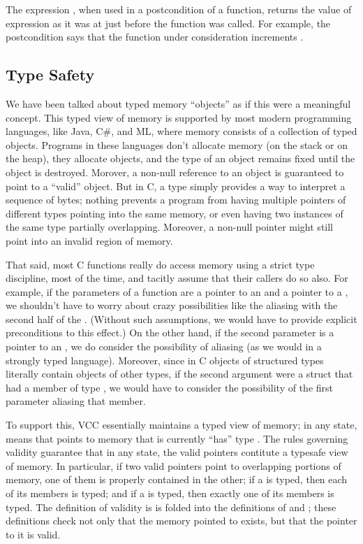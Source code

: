The expression , when used in a postcondition of a
function, returns the value of expression  as it was at just
before the function was called. For example, the postcondition 
 says that the function under consideration
increments .

\subsection*{Type Safety}
We have been talked about typed memory ``objects'' as if this were a
meaningful concept.  This typed view of memory is supported by most
modern programming languages, like Java, C\#, and ML, where memory
consists of a collection of typed objects. Programs in these languages
don't allocate memory (on the stack or on the heap), they allocate
objects, and the type of an object remains fixed until the object is
destroyed. Morover, a non-null reference to an object is guaranteed to
point to a ``valid'' object. But in C, a type simply provides a way to
interpret a sequence of bytes; nothing prevents a program from having
multiple pointers of different types pointing into the same memory, or
even having two instances of the same  type partially
overlapping. Moreover, a non-null pointer might still point into an
invalid region of memory.

That said, most C functions really do access memory using a strict type
discipline, most of the time, and tacitly assume that their callers do
so also. For example, if the parameters of a function are a pointer to
an  and a pointer to a , we shouldn't have to worry
about crazy possibilities like the  aliasing with the second
half of the . (Without such assumptions, we would have to
provide explicit preconditions to this effect.)  On the other hand, if
the second parameter is a pointer to an , we do consider the
possibility of aliasing (as we would in a strongly typed language).
Moreover, since in C objects of structured types literally contain
objects of other types, if the second argument were a struct that had
a member of type , we would have to consider the possibility
of the first parameter aliasing that member. 

To support this, VCC essentially maintains a typed view of memory; in
any state,  means that  points to memory that is
currently ``has'' type . The rules governing validity guarantee
that in any state, the valid pointers contitute a typesafe view of
memory.  In particular, if two valid pointers point to overlapping
portions of memory, one of them is properly contained in the other; if
a  is typed, then each of its members is typed; and if a
 is typed, then exactly one of its members is typed.  The
definition of validity is is folded into the definitions of
 and \vcc{\unwrapped}; these definitions check not
only that the memory pointed to exists, but that the pointer to it is
valid.

